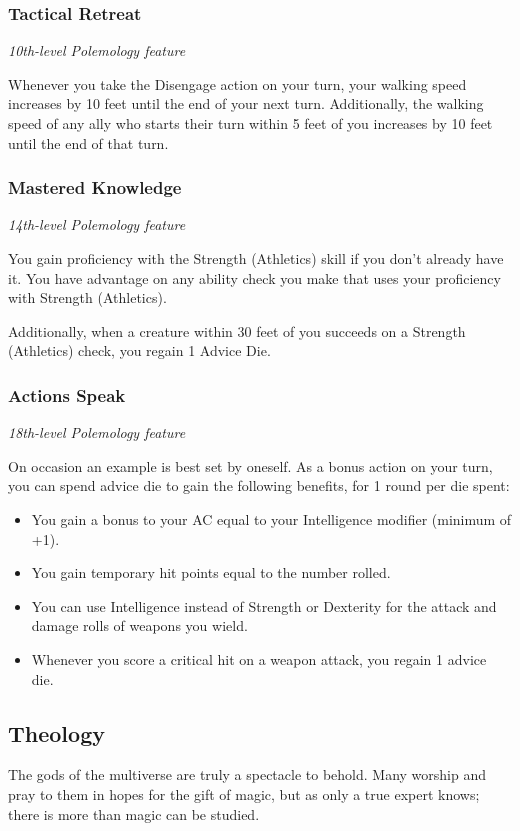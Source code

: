\documentclass[letterpaper,openany,twoside,twocolumn]{book}
\begin{document}
	\subsubsection*{Tactical Retreat}
	\textnormal{\textit{10th-level Polemology feature}}
	
	Whenever you take the Disengage action on your turn, your walking speed increases by 10 feet until the end of your next turn. Additionally, the walking speed of any ally who starts their turn within 5 feet of you increases by 10 feet until the end of that turn.
	
	\subsubsection*{Mastered Knowledge}
	\textnormal{\textit{14th-level Polemology feature}}
	
	You gain proficiency with the Strength (Athletics) skill if you don’t already have it. You have advantage on any ability check you make that uses your proficiency with Strength (Athletics).
	
	Additionally, when a creature within 30 feet of you succeeds on a Strength (Athletics) check, you regain 1 Advice Die.
	
	\subsubsection*{Actions Speak}
	\textnormal{\textit{18th-level Polemology feature}}
	
	On occasion an example is best set by oneself. As a bonus action on your turn, you can spend advice die to gain the following benefits, for 1 round per die spent:
	
	\begin{itemize}
		\item You gain a bonus to your AC equal to your Intelligence modifier (minimum of +1).
		\item You gain temporary hit points equal to the number rolled.
		\item You can use Intelligence instead of Strength or Dexterity for the attack and damage rolls of weapons you wield.
		\item Whenever you score a critical hit on a weapon attack, you regain 1 advice die.	
	\end{itemize}
	
	\subsection*{Theology}
	The gods of the multiverse are truly a spectacle to behold. Many worship and pray to them in hopes for the gift of magic, but as only a true expert knows; there is more than magic can be studied.
	
\end{document}
